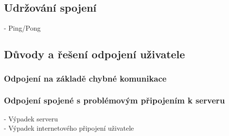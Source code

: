 \subsection{Udržování spojení}
- Ping/Pong



\subsection{Důvody a řešení odpojení uživatele}

\subsubsection{Odpojení na základě chybné komunikace}

\subsubsection{Odpojení spojené s problémovým připojením k serveru}
- Výpadek serveru\\
- Výpadek internetového připojení uživatele
\clearpage





